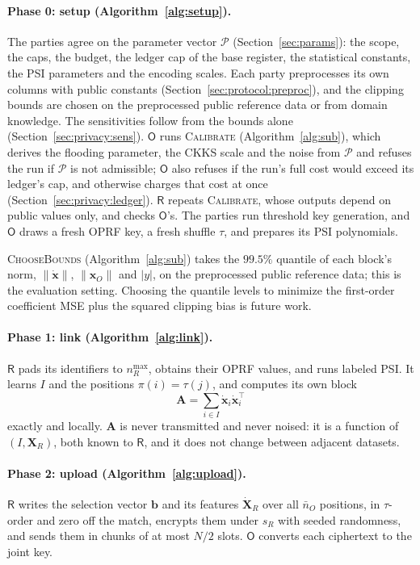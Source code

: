 \documentclass[11pt]{article}
\theoremstyle{definition}
\theoremstyle{plain}
\newcommand{\bXR}{\mathbf{X}_{R}}
\newcommand{\bx}{\mathbf{x}}
\newcommand{\bxd}{\dot{\mathbf{x}}}
\newcommand{\bb}{\mathbf{b}}
\newcommand{\bA}{\mathbf{A}}
\newcommand{\dXR}{\dot{\mathbf{X}}_{R}}
\newcommand{\Party}[1]{\textsf{#1}}
\newcommand{\Rp}{\Party{R}}
\newcommand{\Op}{\Party{O}}
\begin{document}
\paragraph{Phase 0: setup (Algorithm~\ref{alg:setup}).} The parties agree on the parameter vector $\mathcal P$ (Section~\ref{sec:params}): the scope, the caps, the budget, the ledger cap of the base register, the statistical constants, the PSI parameters and the encoding scales. Each party preprocesses its own columns with public constants (Section~\ref{sec:protocol:preproc}), and the clipping bounds are chosen on the preprocessed public reference data or from domain knowledge. The sensitivities follow from the bounds alone (Section~\ref{sec:privacy:sens}). $\Op$ runs \textsc{Calibrate} (Algorithm~\ref{alg:sub}), which derives the flooding parameter, the CKKS scale and the noise from $\mathcal P$ and refuses the run if $\mathcal P$ is not admissible; $\Op$ also refuses if the run's full cost would exceed its ledger's cap, and otherwise charges that cost at once (Section~\ref{sec:privacy:ledger}). $\Rp$ repeats \textsc{Calibrate}, whose outputs depend on public values only, and checks $\Op$'s. The parties run threshold key generation, and $\Op$ draws a fresh OPRF key, a fresh shuffle $\tau$, and prepares its PSI polynomials.

\textsc{ChooseBounds} (Algorithm~\ref{alg:sub}) takes the $99.5\%$ quantile of each block's norm, $\|\bxd\|$, $\|\bx_O\|$ and $|y|$, on the preprocessed public reference data; this is the evaluation setting. Choosing the quantile levels to minimize the first-order coefficient MSE plus the squared clipping bias is future work.

\paragraph{Phase 1: link (Algorithm~\ref{alg:link}).} $\Rp$ pads its identifiers to $n_R^{\max}$, obtains their OPRF values, and runs labeled PSI. It learns $I$ and the positions $\pi(i) = \tau(j)$, and computes its own block
\[
  \bA = \sum_{i \in I} \bxd_i\bxd_i^\top
\]
exactly and locally. $\bA$ is never transmitted and never noised: it is a function of $(I, \bXR)$, both known to $\Rp$, and it does not change between adjacent datasets.

\paragraph{Phase 2: upload (Algorithm~\ref{alg:upload}).} $\Rp$ writes the selection vector $\bb$ and its features $\dXR$ over all $\bar n_O$ positions, in $\tau$-order and zero off the match, encrypts them under $s_R$ with seeded randomness, and sends them in chunks of at most $N/2$ slots. $\Op$ converts each ciphertext to the joint key.
\end{document}
